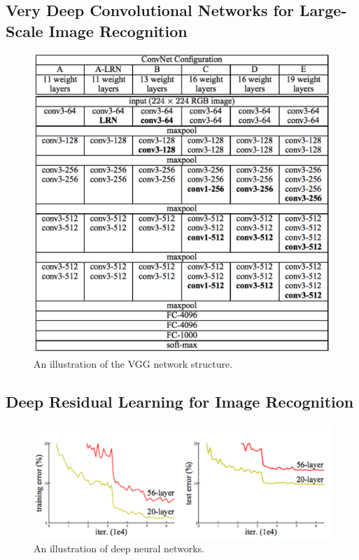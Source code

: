 \documentclass[a4paper,12pt]{article}
\begin{document}
\subsection{Very Deep Convolutional Networks for Large-Scale Image Recognition\cite{SimonyanZ14a}}

 \begin{figure}[H]
  \begin{center}
      \includegraphics[scale=0.75]{vgg16.png}
\end{center}
\caption{An illustration of the VGG network structure.}
 \label{fig:vgg16}
 \end{figure}

\subsection{Deep Residual Learning for Image Recognition\cite{DBLP:journals/corr/HeZRS15}}

\begin{figure}[H]
  \begin{center}
      \includegraphics[scale=0.5]{renet1.png}
\end{center}
\caption{An illustration of deep neural networks.}
 \label {fig:4}
 \end{figure}
\end{document}
